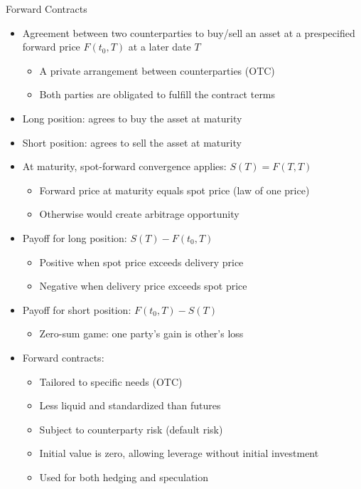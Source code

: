 \documentclass[10pt]{beamer}
\begin{document}
\begin{frame}{Forward Contracts}
  \begin{itemize}[<+->]
    \item Agreement between two counterparties to buy/sell an asset at a prespecified forward price $F(t_0, T)$ at a later date $T$
      \begin{itemize}
        \item A private arrangement between counterparties (OTC)
        \item Both parties are obligated to fulfill the contract terms
      \end{itemize}
    \item Long position: agrees to buy the asset at maturity
    \item Short position: agrees to sell the asset at maturity
    \item At maturity, spot-forward convergence applies: $S(T) = F(T, T)$
      \begin{itemize}
        \item Forward price at maturity equals spot price (law of one price)
        \item Otherwise would create arbitrage opportunity
      \end{itemize}
    \item Payoff for long position: $S(T) - F(t_0, T)$
      \begin{itemize}
        \item Positive when spot price exceeds delivery price
        \item Negative when delivery price exceeds spot price
      \end{itemize}
    \item Payoff for short position: $F(t_0, T) - S(T)$
      \begin{itemize}
        \item Zero-sum game: one party's gain is other's loss
      \end{itemize}
    \item Forward contracts:
      \begin{itemize}
        \item Tailored to specific needs (OTC)
        \item Less liquid and standardized than futures
        \item Subject to counterparty risk (default risk)
        \item Initial value is zero, allowing leverage without initial investment
        \item Used for both hedging and speculation
      \end{itemize}
  \end{itemize}
\end{frame}
\end{document}
